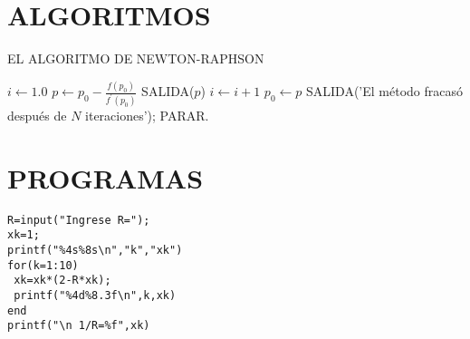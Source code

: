\documentclass[12pt,a4paper]{article}
\begin{document}
	\section{ALGORITMOS}

	\begin{algorithm}[ht]
		\caption{EL ALGORITMO DE NEWTON-RAPHSON}
		\begin{algorithmic}[1]
		    \State $i \gets  1.0$
			\State $p \gets  p_0-\frac{f(p_0)}{f^\prime(p_0)}$
			\State SALIDA($p$)
			\EndIf
			\State $i \gets i+1$
			\State $p_0 \gets p$			
			\EndWhile
			\State SALIDA('El método fracasó después de $N$ iteraciones'); PARAR.
		\end{algorithmic}
	\end{algorithm}
	\section{PROGRAMAS}
	\begin{lstlisting}
R=input("Ingrese R=");
xk=1;
printf("%4s%8s\n","k","xk")
for(k=1:10)
 xk=xk*(2-R*xk);
 printf("%4d%8.3f\n",k,xk)
end
printf("\n 1/R=%f",xk)
\end{lstlisting}
\end{document}
